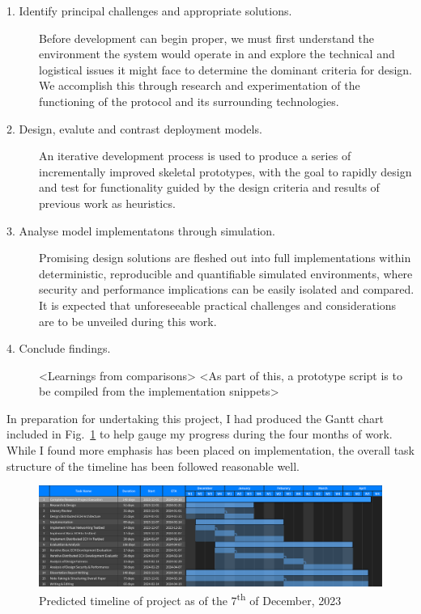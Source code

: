 \begin{description}
	\item[1. Identify principal challenges and appropriate solutions.] Before development can begin proper, we must first understand the environment the system would operate in and explore the technical and logistical issues it might face to determine the dominant criteria for design. We accomplish this through research and experimentation of the functioning of the protocol and its surrounding technologies.
	\item[2. Design, evalute and contrast deployment models.] An iterative development process is used to produce a series of incrementally improved skeletal prototypes, with the goal to rapidly design and test for functionality guided by the design criteria and results of previous work as heuristics.
	\item[3. Analyse model implementatons through simulation.] Promising design solutions are fleshed out into full implementations within deterministic, reproducible and quantifiable simulated environments, where security and performance implications can be easily isolated and compared. It is expected that unforeseeable practical challenges and considerations are to be unveiled during this work.
	\item[4. Conclude findings.] <Learnings from comparisons> <As part of this, a prototype script is to be compiled from the implementation snippets>
\end{description}

In preparation for undertaking this project, I had produced the Gantt chart included in Fig.~\ref{gantt_chart_figure} to help gauge my progress during the four months of work. While I found more emphasis has been placed on implementation, the overall task structure of the timeline has been followed reasonable well.

\begin{figure}[ht]
\centerline{\includegraphics[width=160mm]{images/gantt.png}}
\caption[Project timeline]{Predicted timeline of project as of the 7\textsuperscript{th} of December, 2023}
\label{gantt_chart_figure}
\end{figure}









